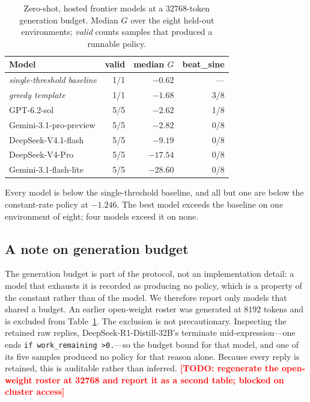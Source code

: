 \documentclass[conference]{IEEEtran}
\newcommand{\TODO}[1]{\textcolor{red}{\textbf{[TODO: #1]}}}
\newcommand{\G}{\ensuremath{G}}
\begin{document}
\begin{table}[t]
\caption{Zero-shot, hosted frontier models at a $32768$-token generation budget. Median
$\G$ over the eight held-out environments; \emph{valid} counts samples that produced a
runnable policy.}
\label{tab:zeroshot}
\centering
\begin{tabular}{lrrr}
\toprule
Model & valid & median \G & beat\_sine \\
\midrule
\textit{single-threshold baseline} & 1/1 & $-0.62$ & --- \\
\textit{greedy template}           & 1/1 & $-1.68$ & 3/8 \\
\midrule
GPT-6.2-sol                  & 5/5 & $-2.62$  & 1/8 \\
Gemini-3.1-pro-preview       & 5/5 & $-2.82$  & 0/8 \\
DeepSeek-V4.1-flash          & 5/5 & $-9.19$  & 0/8 \\
DeepSeek-V4-Pro              & 5/5 & $-17.54$ & 0/8 \\
Gemini-3.1-flash-lite        & 5/5 & $-28.60$ & 0/8 \\
\bottomrule
\end{tabular}
\end{table}

Every model is below the single-threshold baseline, and all but one are below the
constant-rate policy at $-1.246$. The best model exceeds the baseline on one environment
of eight; four models exceed it on none.

\subsection{A note on generation budget}
\label{sec:budget}

The generation budget is part of the protocol, not an implementation detail: a model that
exhausts it is recorded as producing no policy, which is a property of the constant rather
than of the model. We therefore report only models that shared a budget. An earlier
open-weight roster was generated at $8192$ tokens and is excluded from
Table~\ref{tab:zeroshot}. The exclusion is not precautionary. Inspecting the retained raw
replies, DeepSeek-R1-Distill-32B's terminate mid-expression---one ends
\texttt{if work\_remaining >0.}---so the budget bound for that model, and one of its five
samples produced no policy for that reason alone. Because every reply is retained, this is
auditable rather than inferred. \TODO{regenerate the open-weight roster at 32768 and
report it as a second table; blocked on cluster access}
\end{document}
